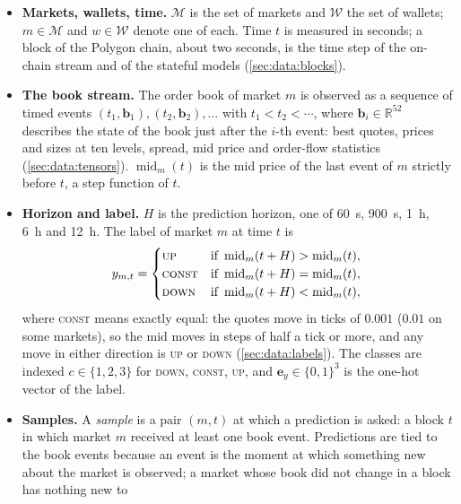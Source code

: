 \begin{itemize}[nosep]
  \item \textbf{Markets, wallets, time.}  $\mathcal{M}$ is the set of markets and
  $\mathcal{W}$ the set of wallets; $m \in \mathcal{M}$ and $w \in \mathcal{W}$ denote one
  of each.  Time $t$ is measured in seconds; a block of the Polygon chain, about two
  seconds, is the time step of the on-chain stream and of the stateful models
  (\cref{sec:data:blocks}).
  \item \textbf{The book stream.}  The order book of market $m$ is observed as a sequence
  of timed events $(t_1, \mathbf{b}_1), (t_2, \mathbf{b}_2), \ldots$ with
  $t_1 < t_2 < \cdots$, where $\mathbf{b}_i \in \mathbb{R}^{52}$ describes the state of
  the book just after the $i$-th event: best quotes, prices and sizes at ten levels,
  spread, mid price and order-flow statistics (\cref{sec:data:tensors}).
  $\operatorname{mid}_m(t)$ is the mid price of the last event of $m$ strictly before
  $t$, a step function of $t$.
  \item \textbf{Horizon and label.}  $H$ is the prediction horizon, one of 60~s, 900~s,
  1~h, 6~h and 12~h.  The label of market $m$ at time $t$ is
  \begin{equation}
    y_{m,t} =
    \begin{cases}
      \textsc{up}    & \text{if } \operatorname{mid}_m(t + H) > \operatorname{mid}_m(t), \\
      \textsc{const} & \text{if } \operatorname{mid}_m(t + H) = \operatorname{mid}_m(t), \\
      \textsc{down}  & \text{if } \operatorname{mid}_m(t + H) < \operatorname{mid}_m(t),
    \end{cases}
    \label{eq:label:bg}
  \end{equation}
  where \textsc{const} means exactly equal: the quotes move in ticks of $0.001$ ($0.01$ on
  some markets), so the mid moves in steps of half a tick or more, and any move in either
  direction is \textsc{up} or \textsc{down}
  (\cref{sec:data:labels}).  The classes are indexed $c \in \{1, 2, 3\}$ for
  \textsc{down}, \textsc{const}, \textsc{up}, and $\mathbf{e}_y \in \{0, 1\}^{3}$ is the
  one-hot vector of the label.
  \item \textbf{Samples.}  A \emph{sample} is a pair $(m, t)$ at which a prediction is
  asked: a block $t$ in which market $m$ received at least one book event.  Predictions
  are tied to the book events because an event is the moment at which something new about
  the market is observed; a market whose book did not change in a block has nothing new to

\end{itemize}

